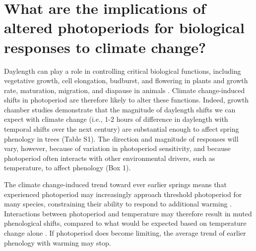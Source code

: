 \documentclass{article}
\begin{document}
\section*{What are the implications of altered photoperiods for biological responses to climate change?}
\par Daylength can play a role in controlling critical biological functions, including vegetative growth, cell elongation, budburst, and flowering in plants \citep{Ashby:1962aa,erwin1998,sidaway2010,Heide:2011aa,Heide:2012aa,Hsu:2011,Linkosalo:2006aa,mimura2007} and growth rate, maturation, migration, and diapause in animals \citep{bradshaw2006,dawbin1966,muir1994,saunders1970,tobin2008,zydlewski2014}. Climate change-induced shifts in photoperiod are therefore likely to alter these functions. 
Indeed, growth chamber studies demonstrate that the magnitude of daylength shifts we can expect with climate change (i.e., 1-2 hours of difference in daylength with temporal shifts over the next century) are substantial enough to affect spring phenology in trees (Table S1). The direction and magnitude of responses will vary, however, because of variation in photoperiod sensitivity, and because photoperiod often interacts with other environmental drivers, such as temperature, to affect phenology (Box 1). 
\par The climate change-induced trend toward ever earlier springs means that experienced photoperiod may increasingly approach threshold photoperiod for many species, constraining their ability to respond to additional warming \citep{koerner2010b,Morin:2010aa,Nienstaedt:1966aa,vitasse2013}. Interactions between photoperiod and temperature may therefore result in muted phenological shifts, compared to what would be expected based on temperature change alone \citep{koerner2010b,mimura2007,wareing1956}. If photoperiod does become limiting, the average trend of earlier phenology with warming \citep{menzel2000,ovaskainen2013,penuelas2002,polgar2013} may stop.


\end{document}
